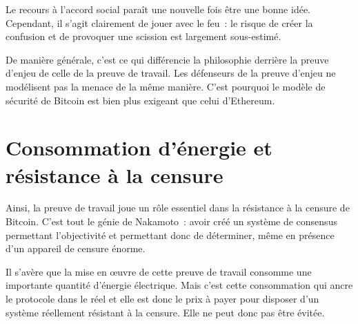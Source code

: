 Le recours à l'accord social paraît une nouvelle fois être une bonne idée. Cependant, il s'agit clairement de jouer avec le feu~: le risque de créer la confusion et de provoquer une scission est largement sous-estimé.

De manière générale, c'est ce qui différencie la philosophie derrière la preuve d'enjeu de celle de la preuve de travail. Les défenseurs de la preuve d'enjeu ne modélisent pas la menace de la même manière. C'est pourquoi le modèle de sécurité de Bitcoin est bien plus exigeant que celui d'Ethereum.

%


\section*{Consommation d'énergie et résistance à la censure}

Ainsi, la preuve de travail joue un rôle essentiel dans la résistance à la censure de Bitcoin. C'est tout le génie de Nakamoto~: avoir créé un système de consensus permettant l'objectivité et permettant donc de déterminer, même en présence d'un appareil de censure énorme.

Il s'avère que la mise en œuvre de cette preuve de travail consomme une importante quantité d'énergie électrique. Mais c'est cette consommation qui ancre le protocole dans le réel et elle est donc le prix à payer pour disposer d'un système réellement résistant à la censure. Elle ne peut donc pas être évitée.

